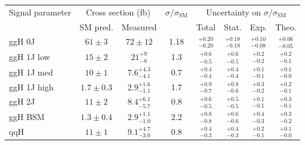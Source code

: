 \begin{tabular}{ l | c | c | c | c | c | c | c }
\multirow{2}{*}{Signal parameter} & \multicolumn{2}{c}{Cross section (fb)}  & \multirow{2}{*}{$\sigma/\sigma_{\text{SM}}$}    & \multicolumn{4}{c}{Uncertainty on $\sigma/\sigma_{\text{SM}}$} \\
             & \multicolumn{1}{c}{SM pred.}  & \multicolumn{1}{c}{Measured} &       & Total              & Stat.              & Exp.               & Theo.               \\
\hline
ggH 0J       & $61 \pm 3$                    & $72 \pm 12$                  & 1.18  & $_{-0.20}^{+0.20}$ & $_{-0.18}^{+0.18}$ & $_{-0.08}^{+0.10}$ & $_{-0.05}^{+0.06}$  \\[3pt]
ggH 1J low   & $15 \pm 2$                    & $21^{+9}_{-8}$               & 1.3   & $_{-0.5}^{+0.6}$   & $_{-0.5}^{+0.6}$   & $_{-0.2}^{+0.2}$   & $_{-0.1}^{+0.2}$    \\[3pt]
ggH 1J med   & $10 \pm 1$                    & $7.6^{+4.3}_{-4.1}$          & 0.7   & $_{-0.4}^{+0.4}$   & $_{-0.4}^{+0.4}$   & $_{-0.1}^{+0.1}$   & $_{-0.0}^{+0.1}$    \\[3pt]
ggH 1J high  & $1.7 \pm 0.3$                 & $2.9^{+1.6}_{-1.1}$          & 1.7   & $_{-0.7}^{+0.9}$   & $_{-0.6}^{+0.8}$   & $_{-0.2}^{+0.3}$   & $_{-0.1}^{+0.2}$    \\[3pt]
ggH 2J       & $11 \pm 2$                    & $8.4^{+6.1}_{-5.7}$          & 0.8   & $_{-0.5}^{+0.6}$   & $_{-0.5}^{+0.5}$   & $_{-0.1}^{+0.1}$   & $_{-0.1}^{+0.3}$    \\[3pt]
ggH BSM      & $1.3 \pm 0.4$                 & $2.9^{+1.1}_{-1.0}$          & 2.2   & $_{-0.8}^{+0.8}$   & $_{-0.6}^{+0.6}$   & $_{-0.3}^{+0.4}$   & $_{-0.2}^{+0.3}$    \\[3pt]
qqH          & $11 \pm 1$                    & $9.1^{+4.7}_{-3.0}$          & 0.8   & $_{-0.3}^{+0.4}$   & $_{-0.3}^{+0.4}$   & $_{-0.1}^{+0.2}$   & $_{-0.0}^{+0.1}$    \\[3pt]
\end{tabular}
